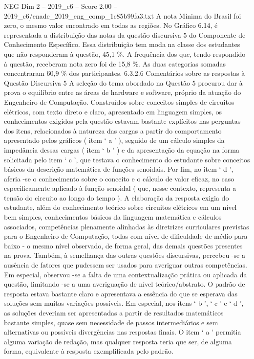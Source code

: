 \begin{textsample}{NEG Dim 2 – 2019\_c6 – Score 2.00 – 2019\_c6/enade\_2019\_eng\_comp\_1c85b99fa3.txt}
A nota Mínima do Brasil foi zero, o mesmo valor encontrado em todas as regiões.
No Gráfico 6.14, é representada a distribuição das notas da questão discursiva 5 do Componente de Conhecimento Específico.
Essa distribuição tem moda na classe dos estudantes que não responderam à questão, 45,1 \%.
A frequência dos que, tendo respondido à questão, receberam nota zero foi de 15,8 \%.
As duas categorias somadas concentraram 60,9 \% dos participantes. 6.3.2.6 Comentários sobre as respostas à Questão Discursiva 5 A seleção do tema abordado na Questão 5 procurou dar à prova o equilíbrio entre as áreas de hardware e software, próprio da atuação do Engenheiro de Computação.
Construídos sobre conceitos simples de circuitos elétricos, com texto direto e claro, apresentado em linguagem simples, os conhecimentos exigidos pela questão estavam bastante explícitos nas perguntas dos itens, relacionados à natureza das cargas a partir do comportamento apresentado pelos gráficos ( item ‘ a ’ ), seguido de um cálculo simples da impedância dessas cargas ( item ‘ b ’ ) e da apresentação da equação na forma solicitada pelo item ‘ c ’, que testava o conhecimento do estudante sobre conceitos básicos da descrição matemática de funções senoidais.
Por fim, no item ‘ d ’, aferia -se o conhecimento sobre o conceito e o cálculo de valor eficaz, no caso especificamente aplicado à função senoidal ( que, nesse contexto, representa a tensão do circuito ao longo do tempo ).
A elaboração da resposta exigia do estudante, além do conhecimento teórico sobre circuitos elétricos em um nível bem simples, conhecimentos básicos da linguagem matemática e cálculos associados, competências plenamente alinhadas às diretrizes curriculares previstas para o Engenheiro de Computação, todas com nível de dificuldade de médio para baixo - o mesmo nível observado, de forma geral, das demais questões presentes na prova.
Também, à semelhança das outras questões discursivas, percebeu -se a ausência de fatores que pudessem ser usados para averiguar outras competências.
Em especial, observou -se a falta de uma contextualização prática ou aplicada da questão, limitando -se a uma averiguação de nível teórico/abstrato.
O padrão de resposta estava bastante claro e apresentava a essência do que se esperava das soluções sem muitas variações possíveis.
Em especial, nos itens ‘ b ’, ‘ c ’ e ‘ d ’, as soluções deveriam ser apresentadas a partir de resultados matemáticos bastante simples, quase sem necessidade de passos intermediários e sem alternativas ou possíveis divergências nas respostas finais.
O item ‘ a ’ permitia alguma variação de redação, mas qualquer resposta teria que ser, de alguma forma, equivalente à resposta exemplificada pelo padrão.

\end{textsample}
